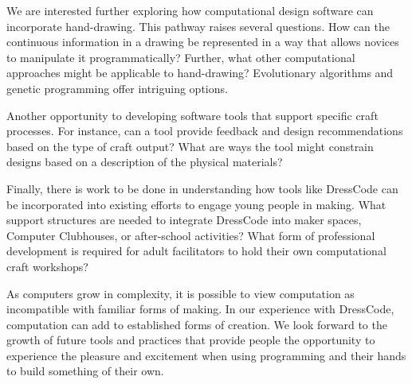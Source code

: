 \documentclass{sigchi}
\begin{document}
We are interested further exploring how computational design software can incorporate hand-drawing. This pathway raises several questions. How can the continuous information in a drawing be represented in a way that allows novices to manipulate it programmatically? Further, what other computational approaches might be applicable to hand-drawing? Evolutionary algorithms and genetic programming offer intriguing options.

Another opportunity to developing software tools that support specific craft processes. For instance, can a tool provide feedback and design recommendations based on the type of craft output? What are ways the tool might constrain designs based on a description of the physical materials? 

Finally, there is work to be done in understanding how tools like DressCode can be incorporated into existing efforts to engage young people in making. What support structures are needed to integrate DressCode into maker spaces, Computer Clubhouses, or after-school activities? What form of professional development is required for adult facilitators to hold their own computational craft workshops?

As computers grow in complexity, it is possible to view computation as incompatible with familiar forms of making. In our experience with DressCode, computation can add to established forms of creation. We look forward to the growth of future tools and practices that provide people the opportunity to experience the pleasure and excitement when using programming and their hands to build something of their own. 



{\footnotesize
}
\end{document}
